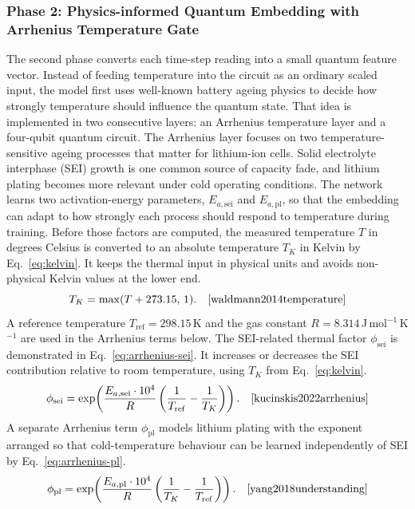 \documentclass[a4paper,fleqn]{cas-sc}
\begin{document}
\subsubsection{Phase 2: Physics-informed Quantum Embedding with Arrhenius Temperature Gate}
The second phase converts each time-step reading into a small quantum feature vector. Instead of feeding temperature into the circuit as an ordinary scaled input, the model first uses well-known battery ageing physics to decide how strongly temperature should influence the quantum state. That idea is implemented in two consecutive layers: an Arrhenius temperature layer and a four-qubit quantum circuit. The Arrhenius layer focuses on two temperature-sensitive ageing processes that matter for lithium-ion cells. Solid electrolyte interphase (SEI) growth is one common source of capacity fade, and lithium plating becomes more relevant under cold operating conditions. The network learns two activation-energy parameters, $E_{a,\mathrm{sei}}$ and $E_{a,\mathrm{pl}}$, so that the embedding can adapt to how strongly each process should respond to temperature during training. Before those factors are computed, the measured temperature $T$ in degrees Celsius is converted to an absolute temperature $T_K$ in Kelvin by Eq.~\eqref{eq:kelvin}. It keeps the thermal input in physical units and avoids non-physical Kelvin values at the lower end.
\begin{equation}
T_K = \max(T + 273.15,\, 1). \quad \cite{waldmann2014temperature}
\label{eq:kelvin}
\end{equation}
A reference temperature $T_{\mathrm{ref}} = 298.15$\,K and the gas constant $R = 8.314$\,J\,mol$^{-1}$\,K$^{-1}$ are used in the Arrhenius terms below. The SEI-related thermal factor $\phi_{\mathrm{sei}}$ is demonstrated in Eq.~\eqref{eq:arrhenius-sei}. It increases or decreases the SEI contribution relative to room temperature, using $T_K$ from Eq.~\eqref{eq:kelvin}. 
\begin{equation}
\phi_{\mathrm{sei}} = \exp\!\left(\frac{E_{a,\mathrm{sei}} \cdot 10^{4}}{R}\left(\frac{1}{T_{\mathrm{ref}}} - \frac{1}{T_K}\right)\right). \quad \cite{kucinskis2022arrhenius}
\label{eq:arrhenius-sei}
\end{equation}
A separate Arrhenius term $\phi_{\mathrm{pl}}$ models lithium plating with the exponent arranged so that cold-temperature behaviour can be learned independently of SEI by Eq.~\eqref{eq:arrhenius-pl}.
\begin{equation}
\phi_{\mathrm{pl}} = \exp\!\left(\frac{E_{a,\mathrm{pl}} \cdot 10^{4}}{R}\left(\frac{1}{T_K} - \frac{1}{T_{\mathrm{ref}}}\right)\right). \quad \cite{yang2018understanding}
\label{eq:arrhenius-pl}
\end{equation}
\end{document}
